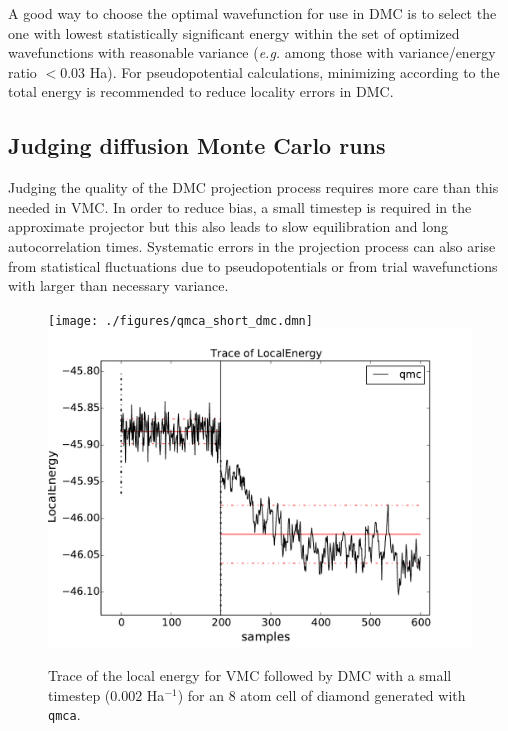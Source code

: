 A good way to choose the optimal wavefunction for use in DMC is to select 
the one with lowest statistically significant energy within the set of 
optimized wavefunctions with reasonable variance (\emph{e.g.} among 
those with variance/energy ratio $<0.03$ Ha).  For pseudopotential 
calculations, minimizing according to the total energy is recommended 
to reduce locality errors in DMC.


\subsection{Judging diffusion Monte Carlo runs}
\label{sec:qmca_judge_dmc}
Judging the quality of the DMC projection process requires more 
care than this needed in VMC.  In order to reduce bias, a small 
timestep is required in the approximate projector but this also 
leads to slow equilibration and long autocorrelation times.  
Systematic errors in the projection process can also arise from 
statistical fluctuations due to pseudopotentials or from trial 
wavefunctions with larger than necessary variance.

\begin{figure}
\begin{center}
  \ifdefined\HCode  
\texttt{[image: ./figures/qmca\_short\_dmc.dmn]}
\else
\includegraphics[trim = 0mm 0mm 0mm 0mm,clip,width=0.75\columnwidth]{./figures/qmca_short_dmc.pdf}
\fi
\end{center}
\caption{Trace of the local energy for VMC followed by DMC with a small timestep ($0.002$ Ha$^{-1}$) for an 8 atom cell of diamond generated with \texttt{qmca}.}
\label{fig:qmca_short_dmc}
\end{figure}

